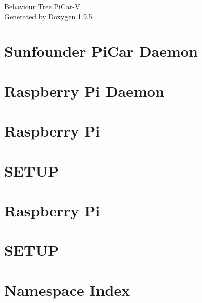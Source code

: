 \documentclass[twoside]{book}
\newcommand{\+}{\discretionary{\mbox{\scriptsize$\hookleftarrow$}}{}{}}
\newcommand{\clearemptydoublepage}{%
    \newpage{\pagestyle{empty}\cleardoublepage}%
  }
\begin{document}
  \raggedbottom
    \hypersetup{pageanchor=false,
                bookmarksnumbered=true,
                pdfencoding=unicode
               }
  \begin{titlepage}
  \vspace*{7cm}
  \begin{center}%
  {\Large Behaviour Tree Pi\+Car-\/V}\\
  \vspace*{1cm}
  {\large Generated by Doxygen 1.9.5}\\
  \end{center}
  \end{titlepage}
  \clearemptydoublepage
  \tableofcontents
  \clearemptydoublepage
  \hypersetup{pageanchor=true}
\chapter{Sunfounder Pi\+Car Daemon}
\label{md_daemon_install_README}

\chapter{Raspberry Pi Daemon}
\label{md_daemon_README}

\chapter{Raspberry Pi}
\label{md_README}

\chapter{SETUP}
\label{md_SETUP}

\chapter{Raspberry Pi}
\label{md_tui_README}

\chapter{SETUP}
\label{md_tui_SETUP}

\chapter{Namespace Index}

\end{document}
